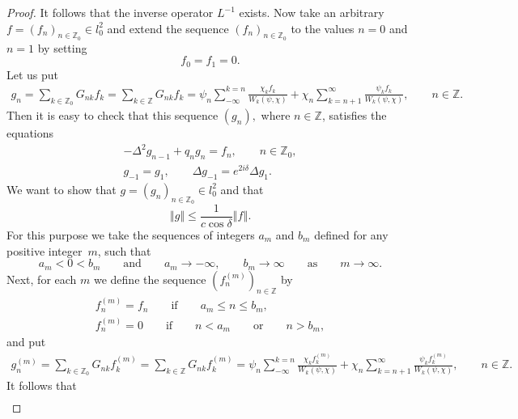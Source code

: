 \documentclass[pdftex]{sigma}
\numberwithin{equation}{section}
\begin{document}
\begin{proof}
It follows that the inverse operator $L^{-1}$ exists. Now take an arbitrary $%
f=(f_{n})_{n\in
\mathbb{Z}
_{0}}\in l_{0}^{2}$ and extend the sequence $(f_{n})_{n\in
\mathbb{Z}
_{0}}$ to the values $n=0$ and $n=1$ by setting%
\begin{equation*}
f_{0}=f_{1}=0.  %
\end{equation*}%
Let us put%
\begin{gather}
g_{n}=\sum_{k\in
\mathbb{Z}
_{0}}G_{nk}f_{k}=\sum_{k\in
\mathbb{Z}
}G_{nk}f_{k}
=\psi _{n}\sum_{-\infty }^{k=n}\frac{\chi _{k}f_{k}}{W_{k}(\psi ,\chi )}%
+\chi _{n}\sum_{k=n+1}^{\infty }\frac{\psi _{k}f_{k}}{W_{k}(\psi ,\chi )},\qquad
n\in
\mathbb{Z}
.  \label{6.14}
\end{gather}%
Then it is easy to check that this sequence $(g_{n}),$ where $n\in
\mathbb{Z}
$, satisf\/ies the equations%
\begin{gather}
-\Delta ^{2}g_{n-1}+q_{n}g_{n}=f_{n},\qquad n\in
\mathbb{Z}
_{0},  \label{6.15}
\\
g_{-1}=g_{1},\qquad \Delta g_{-1}=e^{2i\delta }\Delta g_{1}.
\label{6.16}
\end{gather}%
We want to show that $g=(g_{n})_{n\in
\mathbb{Z}
_{0}}\in l_{0}^{2}$ and that%
\begin{equation}
\left\Vert g\right\Vert \leq \frac{1}{c\cos \delta }\left\Vert f\right\Vert .
\label{6.17}
\end{equation}%
For this purpose we take the sequences of integers $a_{m}$ and $b_{m}$
def\/ined for any positive integer~$m$, such that%
\[
a_{m}<0<b_{m}\qquad \text{and} \qquad a_{m}\rightarrow -\infty ,\qquad
b_{m}\rightarrow \infty \qquad \text{as} \qquad m\rightarrow \infty .
\]%
Next, for each $m$ we def\/ine the sequence $(f_{n}^{(m)})_{n\in
\mathbb{Z}
}$ by%
\begin{gather}
f_{n}^{(m)}=f_{n}\qquad \text{if} \qquad a_{m}\leq n\leq b_{m},  \label{6.18}
\\
f_{n}^{(m)}=0 \qquad \text{if} \qquad n<a_{m} \qquad \text{or} \qquad n>b_{m},  \label{6.19}
\end{gather}%
and put%
\begin{gather*}
g_{n}^{(m)}=\sum_{k\in
\mathbb{Z}
_{0}}G_{nk}f_{k}^{(m)}=\sum_{k\in
\mathbb{Z}
}G_{nk}f_{k}^{(m)}
=\psi _{n}\sum_{-\infty }^{k=n}\frac{\chi _{k}f_{k}^{(m)}}{W_{k}(\psi ,\chi )%
}+\chi _{n}\sum_{k=n+1}^{\infty }\frac{\psi _{k}f_{k}^{(m)}}{W_{k}(\psi
,\chi )},\qquad n\in \mathbb{Z}
.  %
\end{gather*}%
It follows that%
\begin{gather}

\end{gather}
\end{proof}
\end{document}
